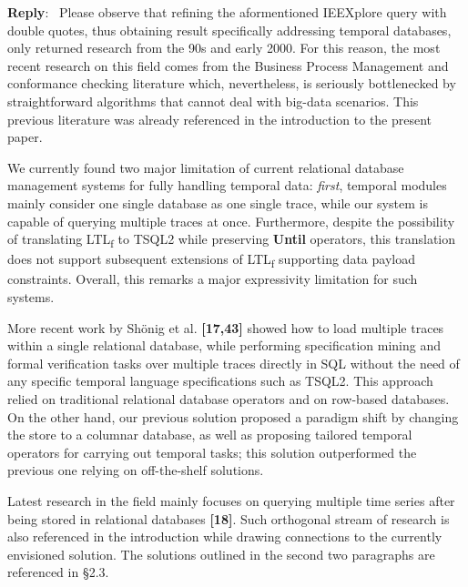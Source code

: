 \documentclass{article}
\newenvironment{reply}
   {\medskip \noindent \begin{sf}\textbf{Reply}:\  }
   {\medskip \end{sf}}
\begin{document}
\begin{reply}
Please observe that refining the aformentioned IEEXplore query with double quotes, thus obtaining result specifically addressing temporal databases, only returned research from the 90s and early 2000. For this reason, the most recent research on this field comes from the Business Process Management and conformance checking literature which, nevertheless, is seriously bottlenecked by straightforward algorithms that cannot deal with big-data scenarios. This previous literature was already referenced in the introduction to the present paper.

We currently found two major limitation of current relational database management systems for fully handling temporal data: \textit{first}, temporal modules mainly consider one single database as one single trace, while our system is capable of querying multiple traces at once. Furthermore, despite the possibility of translating LTL\textsubscript{f} to TSQL2 while preserving \textbf{Until} operators, this translation does not support subsequent extensions of LTL\textsubscript{f} supporting data payload constraints. Overall, this remarks a major expressivity limitation for such systems.

More recent work by Shönig et al. \textbf{[17,43]} showed how to load multiple traces within a single relational database, while performing specification mining and formal verification tasks over multiple traces directly in SQL without the need of any specific temporal language specifications such as TSQL2. This approach relied on traditional relational database operators and on row-based databases. On the other hand, our previous solution proposed a paradigm shift by changing the store to a columnar database,  as well as proposing tailored temporal operators for carrying out temporal tasks; this solution outperformed the previous one relying on off-the-shelf solutions.

Latest research in the field mainly focuses on querying multiple time series after being stored in relational databases \textbf{[18]}. Such orthogonal stream of research is  also referenced in the introduction while drawing connections to the currently envisioned solution. The solutions outlined in the second two  paragraphs are referenced in \S2.3.
\end{reply}
\end{document}

